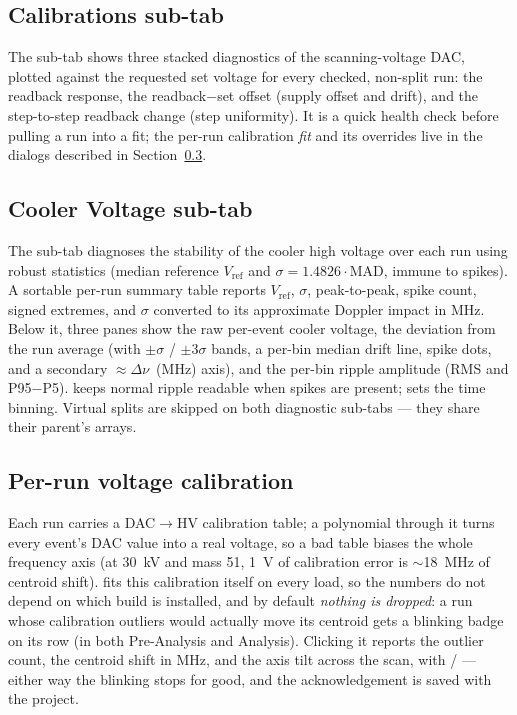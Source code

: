 \subsection{Calibrations sub-tab}

The  sub-tab shows three stacked diagnostics of the
scanning-voltage DAC, plotted against the requested set voltage for
every checked, non-split run: the readback response, the
readback$-$set offset (supply offset and drift), and the
step-to-step readback change (step uniformity). It is a quick health
check before pulling a run into a fit; the per-run calibration
\emph{fit} and its overrides live in the dialogs described in
Section~\ref{sec:pa_calibration}.

\subsection{Cooler Voltage sub-tab}

The  sub-tab diagnoses the stability of the
cooler high voltage over each run using robust statistics (median
reference $V_{\mathrm{ref}}$ and $\sigma = 1.4826\cdot$MAD, immune to
spikes). A sortable per-run summary table reports
$V_{\mathrm{ref}}$, $\sigma$, peak-to-peak, spike count, signed
extremes, and $\sigma$ converted to its approximate Doppler impact in
MHz. Below it, three panes show the raw per-event cooler voltage,
the deviation from the run average (with $\pm\sigma$ / $\pm3\sigma$
bands, a per-bin median drift line, spike dots, and a secondary
$\approx\Delta\nu$~(MHz) axis), and the per-bin ripple amplitude
(RMS and P95$-$P5).  keeps normal ripple
readable when spikes are present;  sets the time binning.
Virtual splits are skipped on both diagnostic sub-tabs --- they share
their parent's arrays.

\subsection{Per-run voltage calibration}
\label{sec:pa_calibration}

Each run carries a DAC$\rightarrow$HV calibration table; a polynomial
through it turns every event's DAC value into a real voltage, so a
bad table biases the whole frequency axis (at 30~kV and mass 51,
1~V of calibration error is $\sim$18~MHz of centroid shift). \denis{}
fits this calibration itself on every load, so the numbers do not
depend on which  build is installed, and by default
\emph{nothing is dropped}: a run whose calibration outliers would
actually move its centroid gets a blinking \app{!} badge on its row
(in both Pre-Analysis and Analysis). Clicking it reports the outlier
count, the centroid shift in MHz, and the axis tilt across the scan,
with  /  --- either way
the blinking stops for good, and the acknowledgement is saved with
the project.

